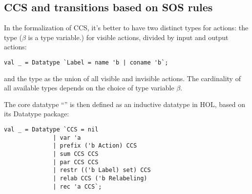 
\subsection{CCS and transitions based on SOS rules}

In the formalization of CCS, it's better to have two distinct
types for actions: the type  ($\beta$ is a type variable.) for visible actions, divided by input
and output actions:
\begin{lstlisting}
val _ = Datatype `Label = name 'b | coname 'b`;
\end{lstlisting}
and the type  as the
union of all visible and invisible actions. The cardinality of all
available types depends on the choice of type variable $\beta$.

The core datatype ``'' is then defined as an inductive
datatype in HOL, based on its Datatype package:
\begin{lstlisting}
val _ = Datatype `CCS = nil
		      | var 'a
		      | prefix ('b Action) CCS
		      | sum CCS CCS
		      | par CCS CCS
		      | restr (('b Label) set) CCS
		      | relab CCS ('b Relabeling)
		      | rec 'a CCS`;
\end{lstlisting}

